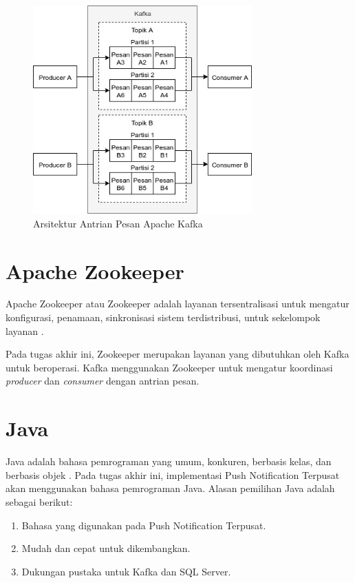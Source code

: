 \begin{figure}[H]
	\centering\includegraphics[width=0.75\textwidth]{bab2/img/arsitektur-mq_kafka.jpg}
	\caption{Arsitektur Antrian Pesan Apache Kafka}
	\label{img:arsitektur-mq_kafka}
\end{figure}

\section{Apache Zookeeper}
\par Apache Zookeeper atau Zookeeper adalah layanan tersentralisasi untuk mengatur konfigurasi, penamaan, sinkronisasi sistem terdistribusi, untuk sekelompok layanan \cite{zookeeper-online}.
\par Pada tugas akhir ini, Zookeeper merupakan layanan yang dibutuhkan oleh Kafka untuk beroperasi. Kafka menggunakan Zookeeper untuk mengatur koordinasi \textit{producer} dan \textit{consumer} dengan antrian pesan.

\section{Java}
\par Java adalah bahasa pemrograman yang umum, konkuren, berbasis kelas, dan berbasis objek \cite{java-online}. Pada tugas akhir ini, implementasi Push Notification Terpusat akan menggunakan bahasa pemrograman Java. Alasan pemilihan Java adalah sebagai berikut:
\begin{enumerate}
	\item Bahasa yang digunakan pada Push Notification Terpusat.
	\item Mudah dan cepat untuk dikembangkan.
	\item Dukungan pustaka untuk Kafka dan SQL Server.
\end{enumerate}

